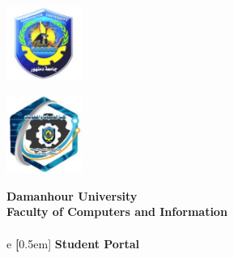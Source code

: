 \documentclass[12pt]{report}
\begin{document}

\begin{titlepage}
    \thispagestyle{empty}

    \begin{minipage}{0.49\textwidth}
        \raggedright
        \includegraphics[width=2.5cm]{images/university_logo.png}
    \end{minipage}
    \begin{minipage}{0.49\textwidth}
        \raggedleft
        \includegraphics[width=2.5cm]{images/faculty_logo.png}
    \end{minipage}

    \vspace{2cm}

    \begin{center}
        {\LARGE \textbf{Damanhour University}}\\[0.5em]
        {\Large \textbf{Faculty of Computers and Information}}\\[1.5cm]

        {}\\e \textbf[0.5em]
        {\Huge \textbf{Student Portal}}\\[1.5cm]


\end{center}
\end{titlepage}
\end{document}

